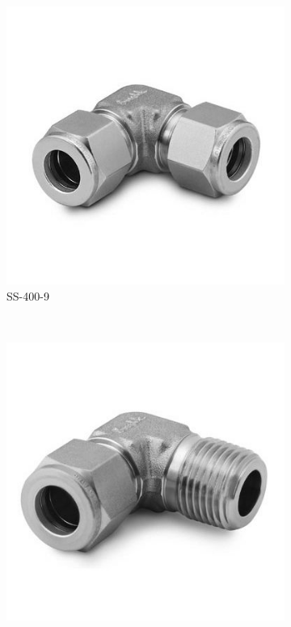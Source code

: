\begin{figure}[H]
    \centering
    \begin{subfigure}[b]{0.2\textwidth}
    \centering
    \includegraphics[width=\textwidth]{appendix/img/interfaces/SS-400-9.jpg}
    \caption{SS-400-9}
    \end{subfigure}
    ~
    \begin{subfigure}[b]{0.2\textwidth}
    \centering
    \includegraphics[width=\textwidth]{appendix/img/interfaces/SS-400-2-2.jpg}

\end{subfigure}
\end{figure}
